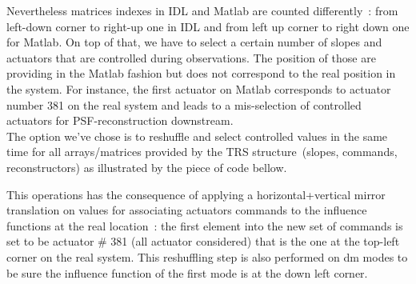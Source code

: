 \documentclass[12pt]{article}
\begin{document}
Nevertheless matrices indexes in IDL and Matlab are counted differently~: from left-down corner to right-up one in IDL and from left up corner to right down one for Matlab. On top of that, we have to select a certain number of slopes and actuators that are controlled during observations. The position of those are providing in the Matlab fashion but does not correspond to the real position in the system. For instance, the first actuator on Matlab corresponds to actuator number 381 on the real system and leads to a mis-selection of controlled actuators for PSF-reconstruction downstream.\\

The option we've chose is to reshuffle and select controlled values in the same time for all arrays/matrices provided by the TRS structure~(slopes, commands, reconstructors) as illustrated by the piece of code bellow.
\begin{center}
\end{center}

This operations has the consequence of applying a horizontal+vertical mirror translation on values for associating actuators commands to the influence functions at the real location~: the first element into the new set of commands is set to be actuator \# 381 (all actuator considered)  that is the one at the top-left corner on the real system. This reshuffling step is also performed on dm modes to be sure the influence function of the first mode is at the down left corner.
\end{document}
